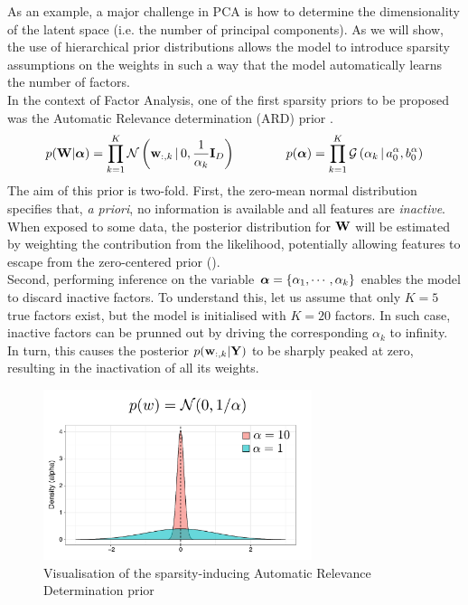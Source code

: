 As an example, a major challenge in PCA is how to determine the dimensionality of the latent space (i.e. the number of principal components). As we will show, the use of hierarchical prior distributions allows the model to introduce sparsity assumptions on the weights in such a way that the model automatically learns the number of factors.\\
In the context of Factor Analysis, one of the first sparsity priors to be proposed was the Automatic Relevance determination (ARD) prior \cite{Neal1995,Mackay1996,Bishop1999a,Bishop1999b}. 
\begin{equation*} \label{eq:ard}
	p({\bf W}|\mbox{\boldmath $\alpha$}) = \prod_{k=1}^{K} \mathcal{N}\left({\bf w}_{:,k} \,|\, 0,\frac{1}{\alpha_{k}}{\bf I}_{D}\right) \\
	\qquad\qquad
	p(\mbox{\boldmath $\alpha$}) = \prod_{k=1}^{K} \mathcal{G}\left(\alpha_k \,|\, a_0^\alpha, b_0^\alpha\right)
\end{equation*}
The aim of this prior is two-fold. First, the zero-mean normal distribution specifies that, \textit{a priori}, no information is available and all features are \textit{inactive}. When exposed to some data, the posterior distribution for ${\bf W}$ will be estimated by weighting the contribution from the likelihood, potentially allowing features to escape from the zero-centered prior ().\\
Second, performing inference on the variable $\mbox{\boldmath $\alpha$} = \{ \alpha_1, \cdots, \alpha_k \}$ enables the model to discard inactive factors. To understand this, let us assume that only $K=5$ true factors exist, but the model is initialised with $K=20$ factors. In such case, inactive factors can be prunned out by driving the corresponding $\alpha_k$ to infinity. In turn, this causes the posterior $p({\bf w}_{:,k}|{\bf Y})$ to be sharply peaked at zero, resulting in the inactivation of all its weights. %

\begin{figure}[H] \begin{center}
	\includegraphics[width=0.7\textwidth]{Chapter2/Figs/ard}
	\caption{Visualisation of the sparsity-inducing Automatic Relevance Determination prior}
	\label{fig:ard}
\end{center} \end{figure}

